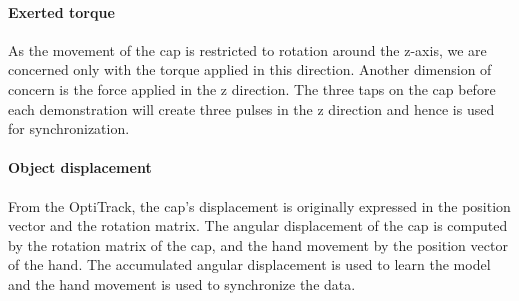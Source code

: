 \paragraph{\textbf{Exerted torque}}
\label{ftsensor}
As the movement of the cap is restricted to rotation around the
z-axis, we are concerned only with the torque applied in this direction.
Another dimension of concern is the force applied in the z direction. The
three taps on the cap before each demonstration will create three
pulses in the z direction and hence is used for synchronization.


\paragraph{\textbf{Object displacement}}
\label{sec:optiktrack}
From the OptiTrack, the cap's displacement is originally expressed in
the position vector and the rotation matrix. The angular
displacement of the cap is computed by the rotation matrix of the cap, and
the hand movement by the position vector of the hand. The accumulated
angular displacement is used to learn the model and the hand movement
is used to synchronize the data. %
%




